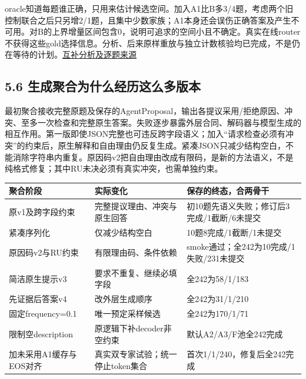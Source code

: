 \documentclass[
  11pt,
  a4paper,
]{article}
\newcounter{none} %
\begin{document}
oracle知道每题谁正确，只用来估计候选空间。加入A1比B多3/4题，考虑两个旧控制联合之后只另增2/1题，且集中少数家族；A1本身还会误伤正确答案及产生不可用。对B的上界增量区间包含0，说明可追求的空间小且不确定。真实在线router不获得这些gold选择信息。分析、后来原样重放与独立计数核验均已完成，不是仍在等待的计划。\href{https://github.com/xiotakut/cf_mrg/blob/main/papers/2026-10-02_cf_moa/author_dossier/records/research/cf_moa_experiment_report.md\#L533}{互补分析及逐题来源}

\subsection{5.6
生成聚合为什么经历这么多版本}\label{ux751fux6210ux805aux5408ux4e3aux4ec0ux4e48ux7ecfux5386ux8fd9ux4e48ux591aux7248ux672c}

最初聚合接收完整原题及保存的AgentProposal，输出各提议采用/拒绝原因、冲突、至多一次检查和完整原生答案。失败逐步暴露外层合同、解码器与模型生成的相互作用。第一版即使JSON完整也可违反跨字段语义；加入``请求检查必须有冲突''的约束后，原生解释和自由理由仍反复生成。紧凑JSON只减少结构空白，不能消除字符串内重复。原因码v2把自由理由改成有限码，是新的方法语义，不是纯格式修复；其中RU未决必须有真实冲突，也需单独约束。

{\def\LTcaptype{none} %
\begin{longtable}[]{@{}
  >{\raggedright\arraybackslash}p{}
  >{\raggedright\arraybackslash}p{}
  >{\raggedright\arraybackslash}p{}@{}}
\toprule\noalign{}
\begin{minipage}[b]{\linewidth}\raggedright
聚合阶段
\end{minipage} & \begin{minipage}[b]{\linewidth}\raggedright
实际变化
\end{minipage} & \begin{minipage}[b]{\linewidth}\raggedright
保存的终态，合两骨干
\end{minipage} \\
\midrule\noalign{}
\endhead
\bottomrule\noalign{}
\endlastfoot
原v1及跨字段约束 & 完整提议理由、冲突与原生回答 &
初10题先语义失败；修订后3完成/1截断/6未提交 \\
紧凑序列化 & 仅减少结构空白 & 10题8完成/1截断/1未提交 \\
原因码v2与RU约束 & 有限理由码、条件依赖 &
smoke通过；全242为10完成/1失败/231未提交 \\
简洁原生提示v3 & 要求不重复、继续必填字段 & 全242为58/1/183 \\
先证据后答案v4 & 改外层生成顺序 & 全242为31/1/210 \\
固定frequency=0.1 & 唯一预定采样候选 & 全242为170/1/71 \\
限制空description & 原逻辑下补decoder非空约束 &
默认A2/A3/F池全242完成 \\
加未采用A1缓存与EOS对齐 & 真实双专家试验；统一停止token集合 &
首次1/1/240，修复后全242完成 \\
\end{longtable}
}
\end{document}
